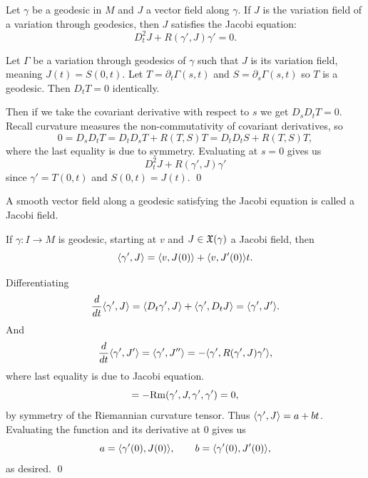\edefn

\bthrm[title=Jacobi equation]

    Let $\gamma$ be a geodesic in $M$ and $J$ a vector field along $\gamma$.
    If $J$ is the variation field of a variation through geodesics, then $J$ satisfies the {\emphcolor Jacobi equation}:
    $$ D_t^2J + R(\gamma',J)\gamma' = 0 . $$

\ethrm

\bproof

    Let $\Gamma$ be a variation through geodesics of $\gamma$ such that $J$ is its variation field, meaning $J(t)=S(0,t)$.
    Let $T=\partial_t\Gamma(s,t)$ and $S=\partial_s\Gamma(s,t)$ so $T$ is a geodesic.
    Then $D_tT=0$ identically.

    Then if we take the covariant derivative with respect to $s$ we get $D_sD_tT=0$.
    Recall curvature measures the non-commutativity of covariant derivatives, so
    $$ 0 = D_sD_tT = D_tD_sT + R(T,S)T = D_tD_tS + R(T,S)T , $$
    where the last equality is due to symmetry.
    Evaluating at $s=0$ gives us
    $$ D_t^2J + R(\gamma',J)\gamma' $$
    since $\gamma'=T(0,t)$ and $S(0,t)=J(t)$.
    \qed

\eproof

\bdefn

    A smooth vector field along a geodesic satisfying the Jacobi equation is called a {\emphcolor Jacobi field}.

\edefn

\blemm

    If $\gamma\colon I\to M$ is geodesic, starting at $v$ and $J\in{\frak X}(\gamma)$ a Jacobi field, then
    $$ \mathopen{}\mathclose{\left<\gamma',J\right>} = \mathopen{}\mathclose{\left<v,J(0)\right>} + \mathopen{}\mathclose{\left<v,J'(0)\right>}t . $$

\elemm

\bproof

    Differentiating
    $$ {{d}\over{dt}}\mathopen{}\mathclose{\left<\gamma',J\right>} = \mathopen{}\mathclose{\left<D_t\gamma',J\right>} + \mathopen{}\mathclose{\left<\gamma',D_tJ\right>} = \mathopen{}\mathclose{\left<\gamma',J'\right>} . $$
    And
    $$ {{d}\over{dt}}\mathopen{}\mathclose{\left<\gamma',J'\right>} = \mathopen{}\mathclose{\left<\gamma',J''\right>} = - \mathopen{}\mathclose{\left<\gamma',R(\gamma',J)\gamma'\right>} , $$
    where last equality is due to Jacobi equation.
    $$ = -{\rm Rm}(\gamma',J,\gamma',\gamma') = 0 , $$
    by symmetry of the Riemannian curvature tensor.
    Thus $\mathopen{}\mathclose{\left<\gamma',J\right>}=a+bt$.
    Evaluating the function and its derivative at $0$ gives us
    $$ a = \mathopen{}\mathclose{\left<\gamma'(0),J(0)\right>},\qquad b = \mathopen{}\mathclose{\left<\gamma'(0),J'(0)\right>} , $$
    as desired.
    \qed

\eproof

\blemm[title=Gauss]

